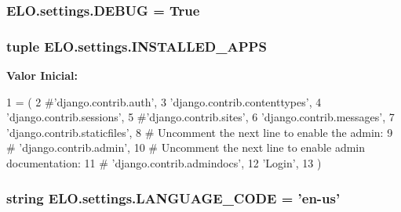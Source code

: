\hypertarget{namespaceELO_1_1settings_a62f457ac29cc6f3e85282c71ce3b4f26}{
\subsubsection[{D\-E\-B\-U\-G}]{\setlength{\rightskip}{0pt plus 5cm}E\-L\-O.\-settings.\-D\-E\-B\-U\-G = True}}\label{df/d5b/namespaceELO_1_1settings_a62f457ac29cc6f3e85282c71ce3b4f26}
\hypertarget{namespaceELO_1_1settings_a1a4752075da59d93477195bcc3fc4765}{
\subsubsection[{I\-N\-S\-T\-A\-L\-L\-E\-D\-\_\-\-A\-P\-P\-S}]{\setlength{\rightskip}{0pt plus 5cm}tuple E\-L\-O.\-settings.\-I\-N\-S\-T\-A\-L\-L\-E\-D\-\_\-\-A\-P\-P\-S}}\label{df/d5b/namespaceELO_1_1settings_a1a4752075da59d93477195bcc3fc4765}
{\bfseries Valor Inicial\-:}
\begin{DoxyCode}
1 = (
2     \textcolor{comment}{#'django.contrib.auth',}
3     \textcolor{stringliteral}{'django.contrib.contenttypes'},
4     \textcolor{stringliteral}{'django.contrib.sessions'},
5     \textcolor{comment}{#'django.contrib.sites',}
6     \textcolor{stringliteral}{'django.contrib.messages'},
7     \textcolor{stringliteral}{'django.contrib.staticfiles'},
8     \textcolor{comment}{# Uncomment the next line to enable the admin:}
9     \textcolor{comment}{# 'django.contrib.admin',}
10     \textcolor{comment}{# Uncomment the next line to enable admin documentation:}
11     \textcolor{comment}{# 'django.contrib.admindocs',}
12     \textcolor{stringliteral}{'Login'},
13 )
\end{DoxyCode}
\hypertarget{namespaceELO_1_1settings_a388841a63bae5418e55fb741f938d4fb}{
\subsubsection[{L\-A\-N\-G\-U\-A\-G\-E\-\_\-\-C\-O\-D\-E}]{\setlength{\rightskip}{0pt plus 5cm}string E\-L\-O.\-settings.\-L\-A\-N\-G\-U\-A\-G\-E\-\_\-\-C\-O\-D\-E = 'en-\/us'}}\label{df/d5b/namespaceELO_1_1settings_a388841a63bae5418e55fb741f938d4fb}
